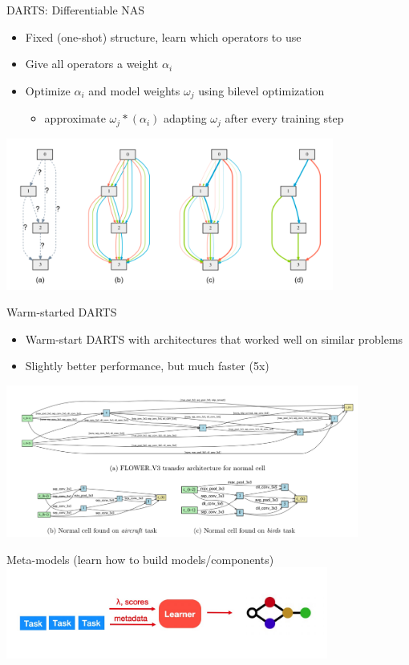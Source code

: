 \documentclass[aspectratio=169,t,handout,xcolor={usenames,dvipsnames}]{beamer}
\begin{document}
\begin{frame}{DARTS: Differentiable NAS}
    \begin{itemize}
        \item Fixed (one-shot) structure, learn which operators to use
        \item Give all operators a weight $\alpha_i$
        \item Optimize $\alpha_i$ and model weights $\omega_j$ using bilevel optimization
        \begin{itemize}
            \item approximate $\omega_j*(\alpha_i)$ adapting $\omega_j$ after every training step
        \end{itemize}
    \end{itemize}
    \centering\includegraphics[height=5cm]{image/Picture2.png}
\end{frame}

\begin{frame}{Warm-started DARTS}
    \begin{itemize}
        \item Warm-start DARTS with architectures that worked well on similar problems
        \item Slightly better performance, but much faster (5x)
    \end{itemize}
    \centering\includegraphics[height=5cm]{image/Picture3.png}
\end{frame}

\begin{frame}{Meta-models}
    (learn how to build models/components)
    \centering\includegraphics[height=3cm]{image/Jietu20220328-233402.jpg}
\end{frame}
\end{document}
